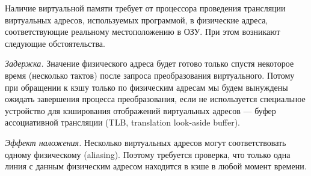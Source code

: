 Наличие виртуальной памяти требует от процессора проведения трансляции виртуальных  адресов, используемых программой, в физические адреса, соответствующие реальному местоположению в ОЗУ. При этом возникают следующие обстоятельства.

\begin{itemize*}
\item    \textit{Задержка.} Значение физического адреса будет готово только спустя некоторое время (несколько тактов) после запроса преобразования виртуального. Потому при обращении к кэшу только по физическим адресам мы будем вынуждены ожидать завершения процесса преобразования, если не используется специальное устройство для кэширования отображений виртуальных адресов --- буфер ассоциативной трансляции (\abbr TLB, translation look-aside buffer).

\item    \textit{Эффект наложения.} Несколько виртуальных адресов могут соответствовать одному физическому (\abbr aliasing). Поэтому требуется проверка, что только одна линия с данным физическим адресом находится в кэше в любой момент времени.
\end{itemize*}

